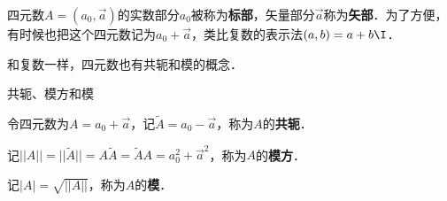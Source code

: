 四元数$A=(a_0, \vec{a})$的实数部分$a_0$被称为\textbf{标部}，矢量部分$\vec{a}$称为\textbf{矢部}．为了方便，有时候也把这个四元数记为$a_0+\vec{a}$，类比复数的表示法$(a, b)=a+b\I$．

和复数一样，四元数也有共轭和模的概念．

\begin{definition}{共轭、模方和模}

令四元数为$A=a_0+\vec{a}$，记$\widetilde{A}=a_0-\vec{a}$，称为$A$的\textbf{共轭}．

记$||A||=||\widetilde{A}||=A\widetilde{A}=\widetilde{A}A=a_0^2+\vec{a}^2$，称为$A$的\textbf{模方}．

记$|A|=\sqrt{||A||}$，称为$A$的\textbf{模}．

\end{definition}


